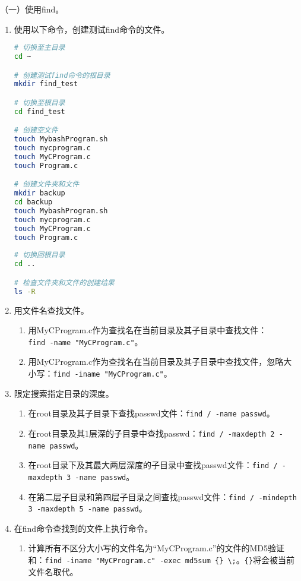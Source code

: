 \vspace{0.1in}
（一）使用find。
\begin{enumerate}
  \item 使用以下命令，创建测试find命令的文件。
\begin{lstlisting}[language=bash]
# 切换至主目录
cd ~

# 创建测试find命令的根目录
mkdir find_test

# 切换至根目录
cd find_test

# 创建空文件
touch MybashProgram.sh
touch mycprogram.c
touch MyCProgram.c
touch Program.c

# 创建文件夹和文件 
mkdir backup
cd backup
touch MybashProgram.sh
touch mycprogram.c
touch MyCProgram.c
touch Program.c
 
# 切换回根目录
cd ..

# 检查文件夹和文件的创建结果
ls -R
\end{lstlisting}
  \item 用文件名查找文件。
    \begin{enumerate}
      \item 用MyCProgram.c作为查找名在当前目录及其子目录中查找文件：\\ \verb|find -name "MyCProgram.c"|。
      \item 用MyCProgram.c作为查找名在当前目录及其子目录中查找文件，忽略大小写：\verb|find -iname "MyCProgram.c"|。
    \end{enumerate}
  \item 限定搜索指定目录的深度。
    \begin{enumerate}
      \item 在root目录及其子目录下查找passwd文件：\verb|find / -name passwd|。
      \item 在root目录及其1层深的子目录中查找passwd：\verb|find / -maxdepth 2 -name passwd|。
      \item 在root目录下及其最大两层深度的子目录中查找passwd文件：\verb|find / -maxdepth 3 -name passwd|。
      \item 在第二层子目录和第四层子目录之间查找passwd文件：\verb|find / -mindepth 3 -maxdepth 5 -name passwd|。
    \end{enumerate}
  \item 在find命令查找到的文件上执行命令。
    \begin{enumerate}
      \item 计算所有不区分大小写的文件名为“MyCProgram.c”的文件的MD5验证和：\verb|find -iname "MyCProgram.c" -exec md5sum {} \;|。\verb|{}|将会被当前文件名取代。
    \end{enumerate}

\end{enumerate}

